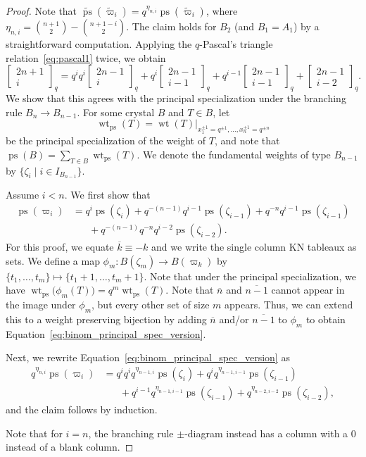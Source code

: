 \documentclass[11pt, leqno]{amsart}
\theoremstyle{plain}
\theoremstyle{definition}
\numberwithin{equation}{section}
\newcommand{\fw}{\varpi} %
\newcommand{\tfw}{\widetilde{\fw}} %
\newcommand{\qbinom}[3]{\left[ \begin{matrix} #1 \\ #2 \end{matrix} \right]_{#3}} %
\newcommand{\wt}{\operatorname{wt}} %
\newcommand{\ps}{\operatorname{ps}} %
\newcommand{\nps}{\widetilde{\ps}} %
\newcommand{\on}{\overline{n}}
\newcommand{\ok}{\overline{k}}
\begin{document}
\begin{proof}
Note that $\nps(\tfw_i) = q^{\eta_{n,i}} \ps(\tfw_i)$, where $\eta_{n,i} = \binom{n+1}{2}-\binom{n+1-i}{2}$.
The claim holds for $B_2$ (and $B_1 = A_1$) by a straightforward computation.
Applying the $q$-Pascal's triangle relation~\eqref{eq:pascal1} twice, we obtain
\[
\qbinom{2n+1}{i}{q} = q^i q^i \qbinom{2n-1}{i}{q} + q^i \qbinom{2n-1}{i-1}{q} + q^{i-1} \qbinom{2n-1}{i-1}{q} + \qbinom{2n-1}{i-2}{q}.
\]
We show that this agrees with the principal specialization under the branching rule $B_n \to B_{n-1}$. For some crystal $B$ and $T \in B$, let
\[
\wt_{\ps}(T) = \wt(T) \bigr|_{x_1^{\pm1}=q^{\pm1}, \dotsc, x_n^{\pm1}=q^{\pm n}}
\]
be the principal specialization of the weight of $T$, and note that $\ps(B) = \sum_{T \in B} \wt_{\ps}(T)$. We denote the fundamental weights of type $B_{n-1}$ by $\{\zeta_i \mid i \in I_{B_{n-1}} \}$.

Assume $i < n$.
We first show that
\begin{equation}
\label{eq:binom_principal_spec_version}
\begin{split}
\ps(\fw_i) & = q^i \ps(\zeta_i) + q^{-(n-1)} q^{i-1} \ps(\zeta_{i-1}) + q^{-n} q^{i-1} \ps(\zeta_{i-1})
\\ & \hspace{20pt} + q^{-(n-1)} q^{-n} q^{i-2} \ps(\zeta_{i-2}).
\end{split}
\end{equation}
For this proof, we equate $\ok \equiv -k$ and we write the single column KN tableaux as sets. We define a map $\phi_m \colon B(\zeta_m) \to B(\fw_k)$ by $\{t_1, \dotsc, t_m\} \mapsto \{t_1+1, \dotsc, t_m+1\}$. Note that under the principal specialization, we have
$
\wt_{\ps}\bigl( \phi_m(T) \bigr) = q^m \wt_{\ps}(T).
$
Note that $\on$ and $\overline{n-1}$ cannot appear in the image under $\phi_m$, but every other set of size $m$ appears.
Thus, we can extend this to a weight preserving bijection by adding $\on$ and/or $\overline{n-1}$ to $\phi_m$ to obtain Equation~\eqref{eq:binom_principal_spec_version}.

Next, we rewrite Equation~\eqref{eq:binom_principal_spec_version} as
\begin{align*}
q^{\eta_{n,i}} \ps(\fw_i) & = q^i q^i q^{\eta_{n-1,i}} \ps(\zeta_i) + q^i q^{\eta_{n-1,i-1}} \ps(\zeta_{i-1})
\\ & \hspace{20pt} + q^{i-1} q^{\eta_{n-1,i-1}} \ps(\zeta_{i-1}) + q^{\eta_{n-2,i-2}} \ps(\zeta_{i-2}),
\end{align*}
and the claim follows by induction.

Note that for $i = n$, the branching rule $\pm$-diagram instead has a column with a $0$ instead of a blank column.
\end{proof}
\end{document}
